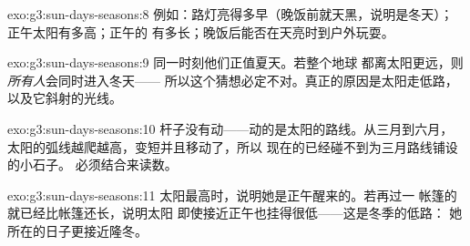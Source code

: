 \begin{solution}{exo:g3:sun-days-seasons:8}
例如：路灯亮得多早（晚饭前就天黑，说明是冬天）；
正午太阳有多高；正午的
有多长；晚饭后能否在天亮时到户外玩耍。
\end{solution}

\begin{solution}{exo:g3:sun-days-seasons:9}
同一时刻他们正值夏天。若整个地球
都离太阳更远，则\emph{所有人}会同时进入冬天——
所以这个猜想必定不对。真正的原因是太阳走低路，
以及它斜射的光线。
\end{solution}

\begin{solution}{exo:g3:sun-days-seasons:10}
杆子没有动——动的是太阳的路线。从三月到六月，
太阳的弧线越爬越高，变短并且移动了，所以
现在的已经碰不到为三月路线铺设的小石子。
必须结合来读数。
\end{solution}

\begin{solution}{exo:g3:sun-days-seasons:11}
太阳最高时，说明她是正午醒来的。若再过一
帐篷的就已经比帐篷还长，说明太阳
即使接近正午也挂得很低——这是冬季的低路：
她所在的日子更接近隆冬。
\end{solution}
